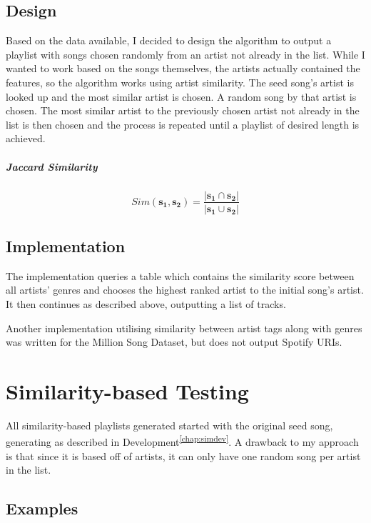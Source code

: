 \documentclass[a4paper, 12pt]{report}
\begin{document}
\section{Design}
Based on the data available, I decided to design the algorithm to output a playlist with songs chosen randomly from an artist not already in the list.
While I wanted to work based on the songs themselves, the artists actually contained the features, so the algorithm works using artist similarity.
The seed song's artist is looked up and the most similar artist is chosen. A random song by that artist is chosen.
The most similar artist to the previously chosen artist not already in the list is then chosen and the process is repeated until a playlist of desired length is achieved.

\paragraph{Jaccard Similarity}
\[Sim(\bm{s_1}, \bm{s_2}) = \frac{|\bm{s_1} \cap \bm{s_2}|}{|\bm{s_1} \cup \bm{s_2}|}\]

\section{Implementation}
The implementation queries a table which contains the similarity score between all artists' genres and chooses the highest ranked artist to the initial song's artist.
It then continues as described above, outputting a list of tracks.

Another implementation utilising similarity between artist tags along with genres was written for the Million Song Dataset, but does not output Spotify URIs.



\chapter{Similarity-based Testing}
All similarity-based playlists generated started with the original seed song, generating as described in Development\textsuperscript{\ref{chap:simdev}}.
A drawback to my approach is that since it is based off of artists, it can only have one random song per artist in the list.

\section{Examples}
\end{document}
